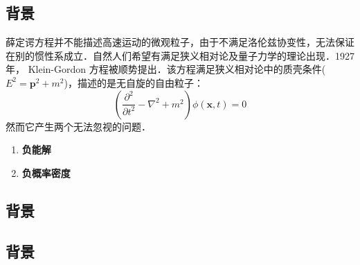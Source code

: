 
\subsection{背景}
薛定谔方程并不能描述高速运动的微观粒子，由于不满足洛伦兹协变性，无法保证在别的惯性系成立．自然人们希望有满足狭义相对论及量子力学的理论出现．1927年， Klein-Gordon 方程被顺势提出．该方程满足狭义相对论中的质壳条件($E^{2}=\boldsymbol{p}^{2}+m^{2}$)，描述的是无自旋的自由粒子：
\begin{equation}
\left(\frac{\partial^{2}}{\partial t^{2}}-\nabla^{2}+m^{2}\right) \phi(\boldsymbol{x}, t)=0
\end{equation}
然而它产生两个无法忽视的问题．

\begin{enumerate}
\item \textbf{负能解}
\item \textbf{负概率密度}
\end{enumerate}
\subsection{背景}
\subsection{背景}